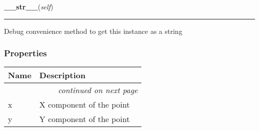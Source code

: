     \label{src:dao:model:point:point:__str__}

    \vspace{0.5ex}

\hspace{.8\funcindent}\begin{boxedminipage}{\funcwidth}

    \raggedright \textbf{\_\_str\_\_}(\textit{self})

    \vspace{-1.5ex}

    \rule{\textwidth}{0.5\fboxrule}
\setlength{\parskip}{2ex}
    Debug convenience method to get this instance as a string

\setlength{\parskip}{1ex}
    \end{boxedminipage}



  \subsubsection{Properties}

    \vspace{-1cm}
\hspace{\varindent}\begin{longtable}{|p{\varnamewidth}|p{\vardescrwidth}|l}
\cline{1-2}
\cline{1-2} \centering \textbf{Name} & \centering \textbf{Description}& \\
\cline{1-2}
\endhead\cline{1-2}\multicolumn{3}{r}{\small\textit{continued on next page}}\\\endfoot\cline{1-2}
\endlastfoot\raggedright x\- & \raggedright X component of the point&\\
\cline{1-2}
\raggedright y\- & \raggedright Y component of the point&\\
\cline{1-2}
\end{longtable}



